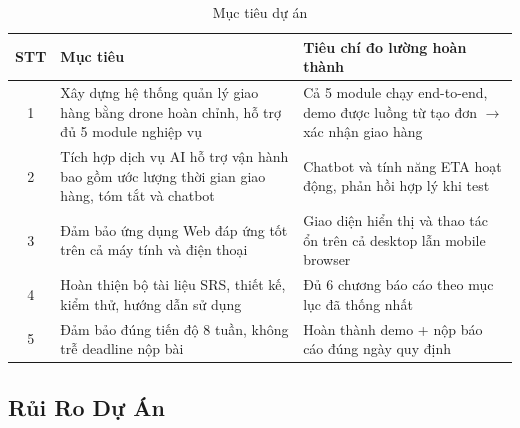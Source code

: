 \begin{table}[H]
  \centering
  \begin{tabularx}{\textwidth}{|c|>{\raggedright\arraybackslash}X|>{\raggedright\arraybackslash}X|}
    \hline
    \textbf{STT} & \textbf{Mục tiêu} & \textbf{Tiêu chí đo lường hoàn thành} \\
    \hline
    1 & Xây dựng hệ thống quản lý giao hàng bằng drone hoàn chỉnh, hỗ trợ đủ 5 module nghiệp vụ & Cả 5 module chạy end-to-end, demo được luồng từ tạo đơn $\rightarrow$ xác nhận giao hàng \\ \hline
    2 & Tích hợp dịch vụ AI hỗ trợ vận hành bao gồm ước lượng thời gian giao hàng, tóm tắt và chatbot & Chatbot và tính năng ETA hoạt động, phản hồi hợp lý khi test \\ \hline
    3 & Đảm bảo ứng dụng Web đáp ứng tốt trên cả máy tính và điện thoại & Giao diện hiển thị và thao tác ổn trên cả desktop lẫn mobile browser  \\ \hline
    4 & Hoàn thiện bộ tài liệu SRS, thiết kế, kiểm thử, hướng dẫn sử dụng & Đủ 6 chương báo cáo theo mục lục đã thống nhất \\ \hline
    5 & Đảm bảo đúng tiến độ 8 tuần, không trễ deadline nộp bài & Hoàn thành demo + nộp báo cáo đúng ngày quy định \\
    \hline
  \end{tabularx}
  \caption{Mục tiêu dự án}
  \label{tab:objectives}
\end{table}

\subsection{Rủi Ro Dự Án}

